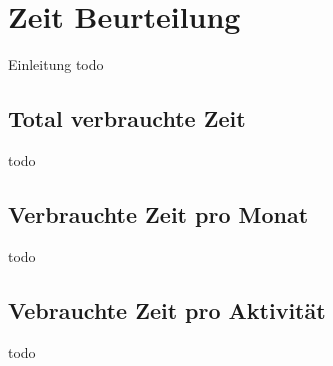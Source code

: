 \chapter{Zeit Beurteilung}
Einleitung todo

\section{Total verbrauchte Zeit}
todo

\section{Verbrauchte Zeit pro Monat}
todo

\section{Vebrauchte Zeit pro Aktivität}
todo